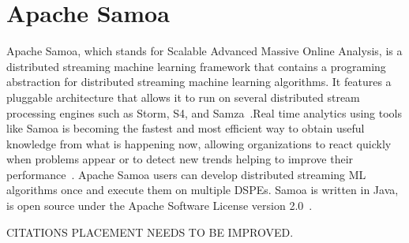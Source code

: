 \section{Apache Samoa}
Apache Samoa, which stands for Scalable Advanced Massive Online Analysis, is a distributed streaming machine learning framework that contains a programing abstraction for distributed streaming machine learning algorithms. It features a pluggable architecture that allows it to run on several distributed stream processing engines such as Storm, S4, and Samza~\cite{samoa-web}.Real time analytics using tools like Samoa is becoming the fastest and most efficient way to obtain useful knowledge from what is happening now, allowing organizations to react quickly when problems appear or to detect new trends helping to improve their performance~\cite{samoa-MUSE}. Apache Samoa users can develop distributed streaming ML algorithms once and execute them on multiple DSPEs. Samoa is written in Java, is open source under the Apache Software License version 2.0~\cite{samoa-JMLR}.

CITATIONS PLACEMENT NEEDS TO BE IMPROVED.
